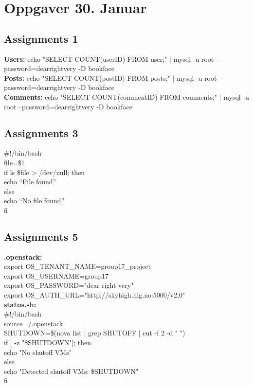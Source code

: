 \section{Oppgaver 30. Januar}

\subsection{Assignments 1} 
\textbf{Users:} echo "SELECT COUNT(userID) FROM user;" | mysql -u root --password=dearrightvery -D bookface\\
\textbf{Posts:} echo "SELECT COUNT(postID) FROM posts;" | mysql -u root --password=dearrightvery -D bookface\\
\textbf{Comments:} echo "SELECT COUNT(commentID) FROM comments;" | mysql -u root --password=dearrightvery -D bookface\\

\subsection{Assignments 3} 
\#!/bin/bash\\
file=\$1\\
if ls \$file > /dev/null; then\\
echo “File found”\\
else\\
echo “No file found”\\
fi\\


\subsection{Assignments 5} 
\textbf{.openstack:}\\
export OS\_TENANT\_NAME=group17\_project \\
export OS\_USERNAME=group17 \\
export OS\_PASSWORD="dear right very" \\
export OS\_AUTH\_URL="http://skyhigh.hig.no:5000/v2.0" \\

\textbf{status.sh:}\\
\#!/bin/bash \\

source ~/.openstack \\

SHUTDOWN=\$(nova list | grep SHUTOFF | cut -f 2 -d " ") \\
if [ -z "\$SHUTDOWN"]; then \\
echo "No shutoff VMs" \\
else\\
echo "Detected shutoff VMs: \$SHUTDOWN"\\
fi\\

